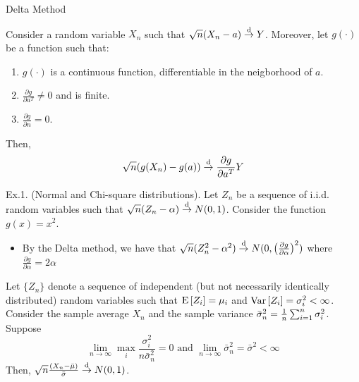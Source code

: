 \begin{bclogo}[couleur=blue!10, arrondi=0.1, logo=,ombre=false]{ Delta Method} 
\begin{small}
Consider a random variable $X_n$ such that $\sqrt{n}(X_n - a)\overset{\text{d}}{\to} Y$. Moreover, let $g(\cdot)$ be a function such that:\begin{enumerate}
\item $g(\cdot)$ is a continuous function, differentiable in the neigborhood of $a$.
\item $\frac{\partial g}{\partial a^T} \neq 0$ and is finite.
\item $\frac{\partial g}{\partial n} = 0 $.
\end{enumerate}
Then, $$\sqrt{n}(g(X_n) - g(a))\overset{\text{d}}{\to} \frac{\partial g}{\partial a^T} Y$$

Ex.1. (Normal and Chi-square distributions). Let $Z_n$ be a sequence of i.i.d. random variables such that $\sqrt{n}(Z_n - \alpha)\overset{\text{d}}{\to} N(0,1)$. Consider the function $g(x) = x^2$.\begin{itemize}
\item By the Delta method, we have that $\sqrt{n}(Z_n^2 - \alpha^2)\overset{\text{d}}{\to} N(0,\big(\frac{\partial g}{\partial \alpha}\big)^2)$ where $\frac{\partial g}{\partial \alpha} = 2\alpha$
\end{itemize}
\end{small}
\end{bclogo}

\begin{theorem}
Let $\{Z_n\}$ denote a sequence of independent (but not necessarily identically distributed) random variables such that $\operatorname{E}\left[Z_i\right] = \mu_i$ and $\operatorname{Var}\left[Z_i\right] = \sigma_i^2 <\infty$. Consider the sample average $X_n$ and the sample variance $\bar\sigma_n^2 = \frac{1}{n} \sum_{i=1}^{n}\sigma_i^2$. Suppose $$\lim_{n\to\infty} \max_{i} \frac{\sigma_i^2}{n\bar\sigma_n^2} = 0 \text{ and } \lim_{n\to\infty} \bar\sigma_n^2 = \bar\sigma^2 < \infty$$
Then, $\sqrt{n}\frac{(X_n - \bar\mu)}{\bar\sigma} \overset{\text{d}}{\to} N(0, 1)$.
\end{theorem}

